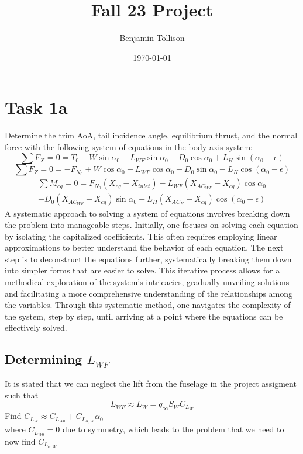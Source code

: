 \documentclass[a4paper, twoside]{article}
\date{\monthyeardate\today}
\author{Benjamin Tollison}
\title{Fall 23 Project}
\begin{document}

\tableofcontents
\newpage
\section{Task 1a}
Determine the trim AoA, tail incidence angle, equilibrium thrust, and the normal force with the following system of equations in the body-axis system:
\[\sum{F_X} = 0 = T_0 - W\sin\alpha_0 + L_{WF}\sin\alpha_0-D_0\cos\alpha_0 + L_H\sin(\alpha_0-\epsilon)\]
\[\sum{F_Z}=0 = -F_{N_0} + W\cos\alpha_0 - L_{WF}\cos\alpha_0-D_0\sin\alpha_0 - L_H\cos(\alpha_0-\epsilon)\]
\begin{align*}
\sum{M_{cg}}= 0 = F_{N_0}(X_{cg}-X_{inlet}) - L_{WF}(X_{AC_{WF}}-X_{cg})\cos\alpha_0\\
- D_0(X_{AC_{WF}}-X_{cg})\sin\alpha_0 - L_{H}(X_{AC_{H}}-X_{cg})\cos(\alpha_0-\epsilon)
\end{align*}
A systematic approach to solving a system of equations involves breaking down the problem into manageable steps. 
Initially, one focuses on solving each equation by isolating the capitalized coefficients. 
This often requires employing linear approximations to better understand the behavior of each equation. 
The next step is to deconstruct the equations further, systematically breaking them down into simpler forms that are easier to solve. 
This iterative process allows for a methodical exploration of the system's intricacies, 
gradually unveiling solutions and facilitating a more comprehensive understanding of the relationships among the variables. 
Through this systematic method, one navigates the complexity of the system, step by step, until arriving at a point where the 
equations can be effectively solved.
\subsection{Determining \(L_{WF}\)}
It is stated that we can neglect the lift from the fuselage in the project assigment such that
\[L_{WF} \approx L_W = q_\infty S_W C_{L_W}\]
Find \(C_{L_W} \approx C_{L_{W0}} + C_{L_{\alpha,W}} \alpha_0\)\\
where \(C_{L_{W0}}=0\) due to symmetry, which leads to the problem that we need to now find \(C_{L_{\alpha,W}}\)
\end{document}
